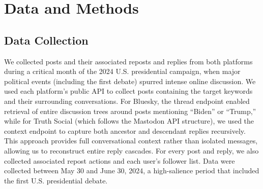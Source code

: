 \documentclass[letterpaper]{article} %
\begin{document}
\section{Data and Methods}

\subsection{Data Collection}
We collected posts and their associated reposts and replies from both platforms during a critical month of the 2024 U.S. presidential campaign, when major political events (including the first debate) spurred intense online discussion. We used each platform's public API to collect posts containing the target keywords and their surrounding conversations. For Bluesky, the thread endpoint enabled retrieval of entire discussion trees around posts mentioning ``Biden'' or ``Trump,'' while for Truth Social (which follows the Mastodon API structure), we used the context endpoint to capture both ancestor and descendant replies recursively. This approach provides full conversational context rather than isolated messages, allowing us to reconstruct entire reply cascades. For every post and reply, we also collected associated repost actions and each user's follower list. Data were collected between May 30 and June 30, 2024, a high-salience period that included the first U.S. presidential debate.
\end{document}

